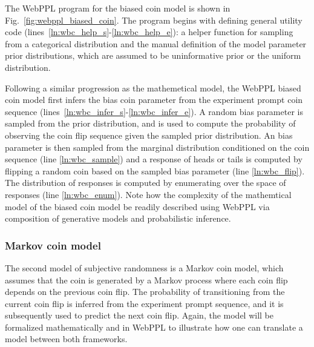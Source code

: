 \documentclass{article}
\begin{document}
The WebPPL program for the biased coin model is shown in Fig.~\ref{fig:webppl_biased_coin}. The program begins with defining general utility code (lines~\ref{ln:wbc_help_s}-\ref{ln:wbc_help_e}): a helper function for sampling from a categorical distribution and the manual definition of the model parameter prior distributions, which are assumed to be uninformative prior or the uniform distribution. 

Following a similar progression as the mathemetical model, the WebPPL biased coin model first infers the bias coin parameter from the experiment prompt coin sequence (lines~\ref{ln:wbc_infer_s}-\ref{ln:wbc_infer_e}). A random bias parameter is sampled from the prior distribution, and is used to compute the probability of observing the coin flip sequence given the sampled prior distribution. An bias parameter is then sampled from the marginal distribution conditioned on the coin sequence (line \ref{ln:wbc_sample}) and a response of heads or tails is computed by flipping a random coin based on the sampled bias parameter (line \ref{ln:wbc_flip}). The distribution of responses is computed by enumerating over the space of responses (line \ref{ln:wbc_enum}). Note how the complexity of the mathemtical model of the biased coin model be readily described using WebPPL via composition of generative models and probabilistic inference. 

\subsubsection{Markov coin model}
\label{s:tutorial:sss:markov}
The second model of subjective randomness is a Markov coin model, which assumes that the coin is generated by a Markov process where each coin flip depends on the previous coin flip. The probability of transitioning from the current coin flip is inferred from the experiment prompt sequence, and it is subsequently used to predict the next coin flip. Again, the model will be formalized mathematically and in WebPPL to illustrate how one can translate a model between both frameworks.
\end{document}
